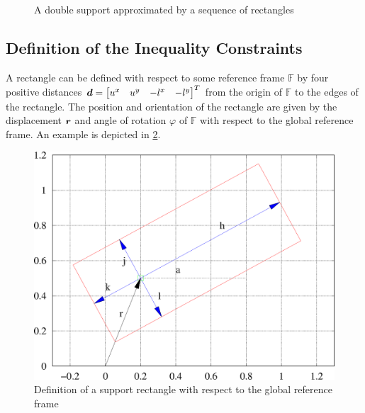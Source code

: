 \begin{figure}[ht]
\begin{minipage}[b]{0.4\linewidth}
    \caption[Approximate double support]{A double support approximated by a sequence of rectangles}
    \label{fig.ds_approx}
\end{minipage}
\end{figure}


\subsection{Definition of the Inequality Constraints}
A rectangle can be defined with respect to some reference frame $\mathbb{F}$ by
four positive distances 
$\mbox{\boldmath $d$} = \begin{bmatrix} u^x & u^y & -l^x & -l^y \end{bmatrix}^T$ 
from the origin of $\mathbb{F}$ to the edges of the rectangle. The position and
orientation of the rectangle are given by the displacement $\mbox{\boldmath $r$}$ and angle 
of rotation $\varphi$ of $\mathbb{F}$ with respect to the global reference frame. 
An example is depicted in \cref{fig.constr}.

\begin{figure}[ht]
    \psfragscanon
    \centerline{%
    \includegraphics[scale=0.5]{Figures/rect_constraints.eps}}
    \caption[Support rectangle]{Definition of a support rectangle with respect to the global reference frame}
    \label{fig.constr}
\end{figure}

